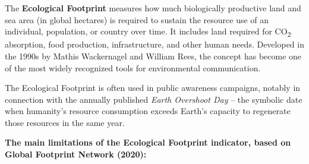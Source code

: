 \documentclass[
  a4paper,
  DIV=11,
  numbers=noendperiod,
  oneside,
  openany]{scrreprt}
\begin{document}
\begin{tcolorbox}[enhanced jigsaw, arc=.35mm, bottomrule=.15mm, bottomtitle=1mm, breakable, colback=white, colbacktitle=quarto-callout-tip-color!10!white, colframe=quarto-callout-tip-color-frame, coltitle=black, left=2mm, leftrule=.75mm, opacityback=0, opacitybacktitle=0.6, rightrule=.15mm, title={The Ecological Footprint -- Explanation and Critique}, titlerule=0mm, toprule=.15mm, toptitle=1mm]

The \textbf{Ecological Footprint} measures how much biologically
productive land and sea area (in global hectares) is required to sustain
the resource use of an individual, population, or country over time. It
includes land required for CO\textsubscript{2} absorption, food
production, infrastructure, and other human needs. Developed in the
1990s by Mathis Wackernagel and William Rees, the concept has become one
of the most widely recognized tools for environmental communication.

The Ecological Footprint is often used in public awareness campaigns,
notably in connection with the annually published \emph{Earth Overshoot
Day} -- the symbolic date when humanity's resource consumption exceeds
Earth's capacity to regenerate those resources in the same year.

\textbf{The main limitations of the Ecological Footprint indicator,
based on Global Footprint Network (2020):}


\end{tcolorbox}
\end{document}
